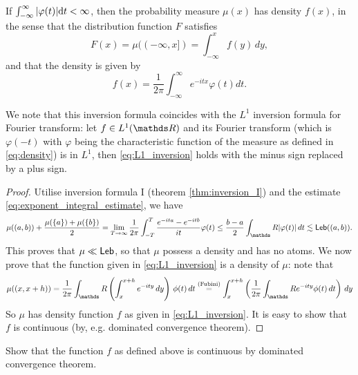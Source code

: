 \begin{proposition}
If $\int_{-\infty}^\infty |\varphi(t)| \mathrm{d} t < \infty$, then the probability measure $\mu(x)$ has density $f(x)$, in the sense that the distribution function $F$ satisfies
\begin{equation} \label{eq:density}
    F(x) = \mu((-\infty,x]) = \int_{-\infty}^x f(y) \, dy,
\end{equation}
and that the density is given by
\begin{equation} \label{eq:L1_inversion}
    f(x) = \frac{1}{2\pi} \int_{-\infty}^\infty e^{-itx} \varphi(t) dt.
\end{equation}
\end{proposition}

We note that this inversion formula coincides with the $L^1$ inversion formula for Fourier transform: let $f \in L^1(\R)$ and its Fourier transform (which is $\varphi(-t)$ with $\varphi$ being the characteristic function of the measure as defined in \eqref{eq:density}) is in $L^1$, then \eqref{eq:L1_inversion} holds with the minus sign replaced by a plus sign.

\begin{proof}
Utilise inversion formula I (theorem \ref{thm:inversion_I}) and the estimate \eqref{eq:exponent_integral_estimate}, we have
\begin{equation}
\mu((a,b)) + \frac{\mu(\set{a}) + \mu(\set{b})}{2} = \lim_{T\to\infty} \frac{1}{2\pi} \int_{-T}^T \frac{e^{-ita}-e^{-itb}}{it} \varphi(t) \leq \frac{b-a}{2} \int_\R |\varphi(t)| \, dt \lesssim \Leb((a,b)).
\end{equation}
This proves that $\mu \ll \mathsf{Leb}$, so that $\mu$ possess a density and has no atoms. We now prove that the function given in \eqref{eq:L1_inversion} is a density of $\mu$: note that
\begin{equation}
\mu((x,x+h)) = \frac{1}{2\pi} \int_\R \bracket{\int_x^{x+h} e^{-ity} \, dy} \, \phi(t) \, dt \overset{\text{(Fubini)}}{=} \int_x^{x+h} \bracket{\frac{1}{2\pi} \int_\R e^{-ity} \phi(t) \, dt} \, dy
\end{equation}
So $\mu$ has density function $f$ as given in \eqref{eq:L1_inversion}. It is easy to show that $f$ is continuous (by, e.g. dominated convergence theorem).
\end{proof}

\begin{exercise}
Show that the function $f$ as defined above is continuous by dominated convergence theorem.
\end{exercise}

